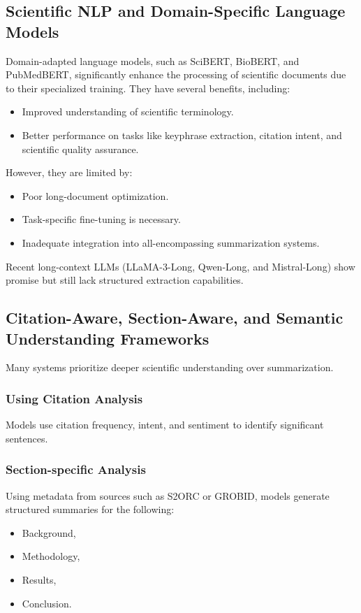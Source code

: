 \documentclass[conference]{IEEEtran}
\begin{document}
\subsection{Scientific NLP and Domain-Specific Language Models}
Domain-adapted language models, such as SciBERT, BioBERT, and PubMedBERT, significantly enhance the processing of scientific documents due to their specialized training. They have several benefits, including:
\begin{itemize}
    \item Improved understanding of scientific terminology.
    \item Better performance on tasks like keyphrase extraction, citation intent, and scientific quality assurance.
\end{itemize}

However, they are limited by: 
\begin{itemize}
    \item Poor long-document optimization.
    \item Task-specific fine-tuning is necessary.
    \item Inadequate integration into all-encompassing summarization systems.
\end{itemize}

Recent long-context LLMs (LLaMA-3-Long, Qwen-Long, and Mistral-Long) show promise but still lack structured extraction capabilities.
\subsection{Citation-Aware, Section-Aware, and Semantic Understanding Frameworks}
Many systems prioritize deeper scientific understanding over summarization.

\subsubsection{Using Citation Analysis}
Models use citation frequency, intent, and sentiment to identify significant sentences.

\subsubsection{Section-specific Analysis}
Using metadata from sources such as S2ORC or GROBID, models generate structured summaries for the following:
\begin{itemize}
    \item Background,
    \item Methodology,
    \item Results,
    \item Conclusion.
\end{itemize}
\end{document}
